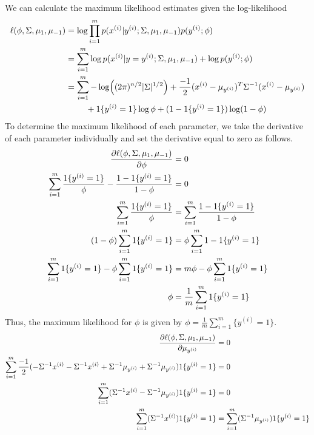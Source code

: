 \documentclass[11pt,a4paper,titlepage]{article}
\begin{document}
{\subsection{}{
\quad We can calculate the maximum likelihood estimates given the log-likelihood
\begin{align*}
	\ell(\phi,\Sigma, \mu_{1}, \mu_{-1}) &= \log\prod_{i=1}^m p(x^{(i)}|y^{(i)}; \Sigma, \mu_{1}, \mu_{-1})p(y^{(i)};\phi)
    \\&= \sum_{i=1}^m\log p(x^{(i)}|y=y^{(i)}; \Sigma, \mu_{1}, \mu_{-1}) + \log p(y^{(i)};\phi)
    \\&= \sum_{i=1}^m -\log((2\pi)^{n/2}|\Sigma|^{1/2}) + \frac{-1}{2}(x^{(i)}-\mu_{y^{(i)}})^T \Sigma^{-1} (x^{(i)}-\mu_{y^{(i)}}) 
    \\&\hphantom{\sum_{i=1}^m-} + 1\{y^{(i)} = 1\}\log\phi + (1-1\{y^{(i)} = 1\}) \log(1-\phi)
\end{align*}
\quad To determine the maximum likelihood of each parameter, we take the derivative of each parameter individually and set the derivative equal to zero as follows.
\begin{align*}
	\pdv{\ell(\phi,\Sigma, \mu_{1}, \mu_{-1})}{\phi} &= 0
    \\ \sum_{i=1}^m \frac{1\{y^{(i)} = 1\}}{\phi} - \frac{1-1\{y^{(i)} = 1\}}{1-\phi} &= 0
    \\ \sum_{i=1}^m \frac{1\{y^{(i)} = 1\}}{\phi} &= \sum_{i=1}^m \frac{1-1\{y^{(i)} = 1\}}{1-\phi}
    \\ (1-\phi)\sum_{i=1}^m 1\{y^{(i)} = 1\} &= \phi\sum_{i=1}^m 1-1\{y^{(i)} = 1\}
    \\ \sum_{i=1}^m 1\{y^{(i)} = 1\} - \phi\sum_{i=1}^m 1\{y^{(i)} = 1\} &= m\phi - \phi \sum_{i=1}^m 1\{y^{(i)} = 1\}
    \\ \phi &= \frac{1}{m} \sum_{i=1}^m 1\{y^{(i)} = 1\}
\end{align*}
Thus, the maximum likelihood for $\phi$ is given by $\phi = \frac{1}{m} \sum_{i=1}^m \{y^{(i)} = 1\}$.
\begin{align*}
	\pdv{\ell(\phi,\Sigma, \mu_{1}, \mu_{-1})}{\mu_{y^{(i)}}} &= 0
    \\ \sum_{i=1}^m \frac{-1}{2} (-\Sigma^{-1}x^{(i)} - \Sigma^{-1}x^{(i)} + \Sigma^{-1}\mu_{y^{(i)}} + \Sigma^{-1}\mu_{y^{(i)}}) 1\{y^{(i)} = 1\}&= 0
    \\ \sum_{i=1}^m (\Sigma^{-1}x^{(i)} - \Sigma^{-1}\mu_{y^{(i)}}) 1\{y^{(i)} = 1\}&= 0
    \\ \sum_{i=1}^m (\Sigma^{-1}x^{(i)}) 1\{y^{(i)} = 1\} &= \sum_{i=1}^m (\Sigma^{-1}\mu_{y^{(i)}}) 1\{y^{(i)} = 1\}

\end{align*}}}
\end{document}
